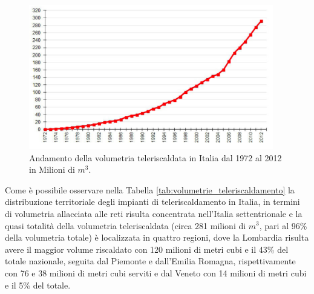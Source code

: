 \documentclass[laurea,oneside,11pt]{USiena_tesiLM3}
\begin{document}
\begin{figure}[!ht]
\centering
\includegraphics[width=0.95\textwidth]{figure/volumetria_teleriscaldata} 
\caption{Andamento della volumetria teleriscaldata in Italia dal 1972 al 2012 in Milioni di $m^3$.}
\label{fig:volumetria_teleriscaldata}
\end{figure}

Come è possibile osservare nella Tabella \ref{tab:volumetrie_teleriscaldamento} la distribuzione territoriale degli impianti di teleriscaldamento in Italia, in termini di volumetria allacciata alle reti risulta concentrata nell'Italia settentrionale e la quasi totalità della volumetria teleriscaldata (circa 281 milioni di $m^3$, pari al 96\% della volumetria totale) è localizzata in quattro regioni, dove la Lombardia risulta avere il maggior volume riscaldato con 120 milioni di metri cubi e il 43\% del totale nazionale, seguita dal Piemonte e dall'Emilia Romagna, rispettivamente con 76 e 38 milioni di metri cubi serviti e dal Veneto con 14 milioni di metri cubi e il 5\% del totale.
\end{document}
